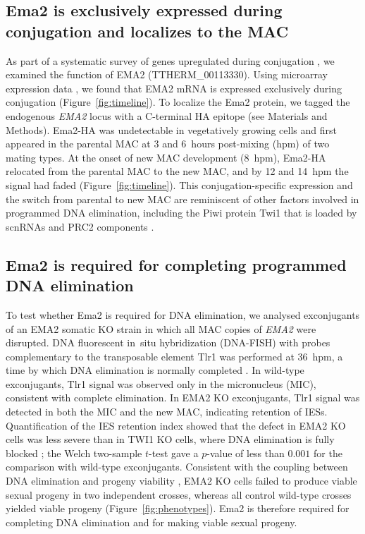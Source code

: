 \documentclass[11pt]{article}
\begin{document}
\subsection{Ema2 is exclusively expressed during conjugation and localizes
to the MAC}

As part of a systematic survey of genes upregulated during conjugation
\citep{loidl2021meiosis,miao2009microarray}, we examined the function of
EMA2 (TTHERM\_00113330). Using microarray expression data
\citep{miao2009microarray}, we found that EMA2 mRNA is expressed
exclusively during conjugation (Figure~\ref{fig:timeline}). To localize the
Ema2 protein, we tagged the endogenous \emph{EMA2} locus with a C-terminal
HA epitope (see Materials and Methods). Ema2-HA was undetectable in
vegetatively growing cells and first appeared in the parental MAC at 3 and
6~hours post-mixing (hpm) of two mating types. At the onset of new MAC
development (8~hpm), Ema2-HA relocated from the parental MAC to the new
MAC, and by 12 and 14~hpm the signal had faded
(Figure~\ref{fig:timeline}). This conjugation-specific expression and the
switch from parental to new MAC are reminiscent of other factors involved
in programmed DNA elimination, including the Piwi protein Twi1 that is
loaded by scnRNAs \citep{mochizuki2002twi1,noto2010giw1} and PRC2
components \citep{liu2007rnai}.

\subsection{Ema2 is required for completing programmed DNA elimination}

To test whether Ema2 is required for DNA elimination, we analysed
exconjugants of an EMA2 somatic KO strain in which all MAC copies of
\emph{EMA2} were disrupted. DNA fluorescent in~situ hybridization (DNA-FISH)
with probes complementary to the transposable element Tlr1
\citep{cheng2010transposase} was performed at 36~hpm, a time by which DNA
elimination is normally completed \citep{chalker2011ciliate}. In wild-type
exconjugants, Tlr1 signal was observed only in the micronucleus (MIC),
consistent with complete elimination. In EMA2 KO exconjugants, Tlr1 signal
was detected in both the MIC and the new MAC, indicating retention of
IESs. Quantification of the IES retention index showed that the defect in
EMA2 KO cells was less severe than in TWI1 KO cells, where DNA elimination
is fully blocked \citep{mochizuki2002twi1}; the Welch two-sample $t$-test
gave a $p$-value of less than $0.001$ for the comparison with wild-type
exconjugants. Consistent with the coupling between DNA elimination and
progeny viability \citep{cheng2010transposase}, EMA2 KO cells failed to
produce viable sexual progeny in two independent crosses, whereas all
control wild-type crosses yielded viable progeny
(Figure~\ref{fig:phenotypes}). Ema2 is therefore required for completing
DNA elimination and for making viable sexual progeny.
\end{document}
